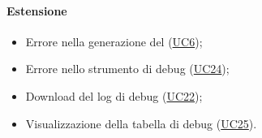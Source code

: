 \paragraph*{Estensione}
\begin{itemize}
  \item Errore nella generazione del  (\hyperref[UC6]{UC6});
  \item Errore nello strumento di debug (\hyperref[UC24]{UC24});
  \item Download del log di debug (\hyperref[UC22]{UC22});
  \item Visualizzazione della tabella di debug (\hyperref[UC25]{UC25}).
\end{itemize}